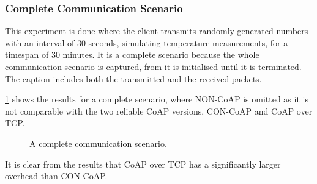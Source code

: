 

\subsubsection{Complete Communication Scenario}
This experiment is done where the client transmits randomly generated numbers with an interval of 30 seconds, simulating temperature measurements, for a timespan of 30 minutes.
It is a complete scenario because the whole communication scenario is captured, from it is initialised until it is terminated. The caption includes both the transmitted and the received packets.

\figurename{\ref{fig:completescenario}} shows the results for a complete scenario, where NON-CoAP is omitted as it is not comparable with the two reliable CoAP versions, CON-CoAP and CoAP over TCP. 
\begin{figure}[bht]
	\caption{A complete communication scenario.}
	\label{fig:completescenario}
\end{figure}

It is clear from the results that CoAP over TCP has a significantly larger overhead than CON-CoAP.

